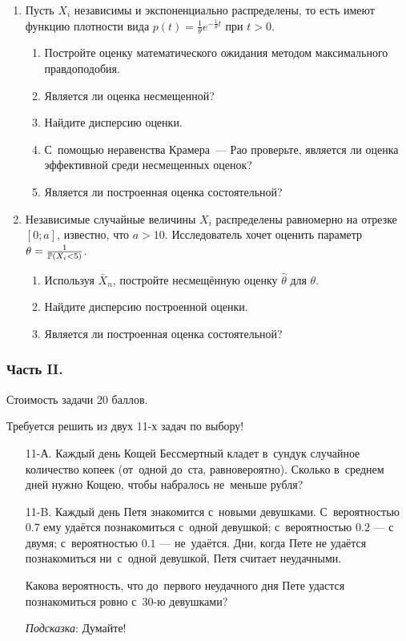 \begin{enumerate}
\item Пусть $X_{i}$ независимы и экспоненциально распределены, то есть имеют функцию
плотности вида
$p(t)=\frac{1}{\theta}e^{-\frac{1}{\theta}t}$ при $t>0$.
\begin{enumerate}
\item Постройте оценку математического ожидания методом максимального правдоподобия.
\item Является ли оценка несмещенной?
\item Найдите дисперсию оценки.
\item С~помощью неравенства Крамера~— Рао проверьте, является ли оценка эффективной
среди несмещенных оценок?
\item Является ли построенная оценка состоятельной?
\end{enumerate}


\item Независимые случайные величины $X_{i}$ распределены равномерно на отрезке
$[0;a]$, известно, что $a>10$. Исследователь хочет оценить параметр $\theta =
\frac{1}{\P(X_{i}<5)}$.
\begin{enumerate}
\item Используя $\bar X_{n}$, постройте несмещённую оценку $\hat{\theta}$ для $\theta$.
\item Найдите дисперсию построенной оценки.
\item Является ли построенная оценка состоятельной?
\end{enumerate}
\end{enumerate}

\subsubsection*{Часть II.}

Стоимость задачи 20 баллов.

Требуется решить \textbf{} из двух 11-х задач по выбору!

\begin{enumerate}
\item[11-А.] Каждый день Кощей Бессмертный кладет в~сундук случайное количество
копеек (от~одной до~ста, равновероятно). Сколько в~среднем дней нужно Кощею,
чтобы набралось не~меньше рубля?

\item[11-B.] Каждый день Петя знакомится с~новыми девушками. С~вероятностью $0.7$
ему удаётся познакомиться с~одной девушкой; с~вероятностью $0.2$ — с двумя;
с~вероятностью $0.1$ — не~удаётся. Дни, когда Пете не удаётся познакомиться
ни~с~одной девушкой, Петя считает неудачными.

Какова вероятность, что до~первого неудачного дня Пете удастся познакомиться ровно
с~30-ю девушками?

\emph{Подсказка}: Думайте!
\end{enumerate}



